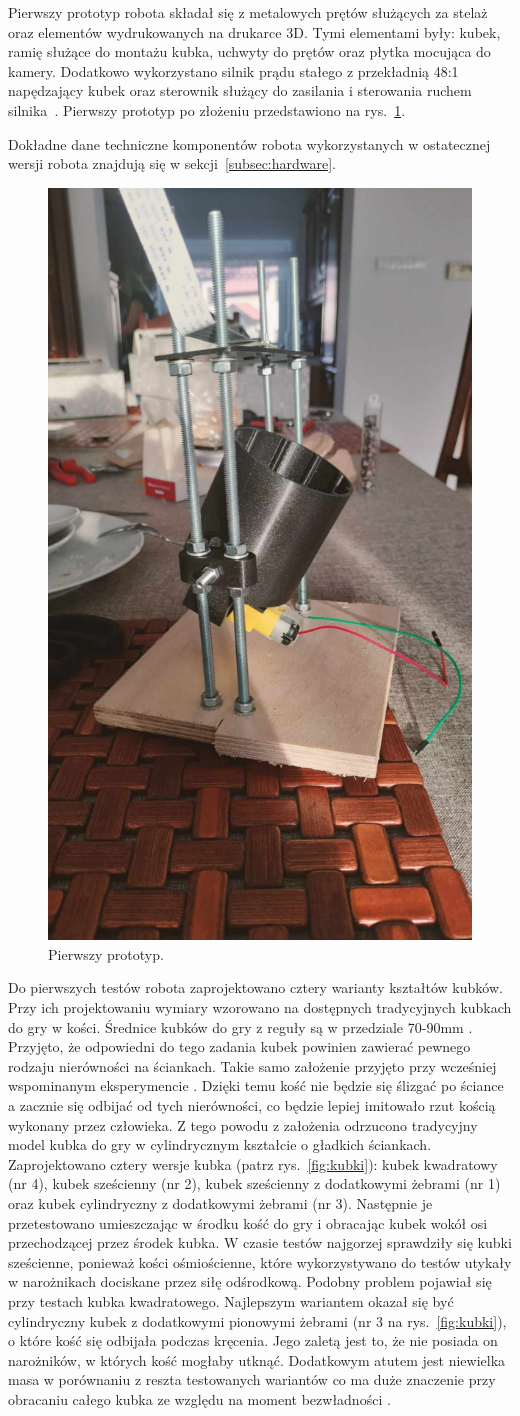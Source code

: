 Pierwszy prototyp robota składał się z metalowych prętów służących za stelaż oraz elementów wydrukowanych na drukarce 3D.
Tymi elementami były: kubek, ramię służące do montażu kubka, uchwyty do prętów oraz płytka mocująca do kamery. Dodatkowo
wykorzystano silnik prądu stałego z przekładnią 48:1 napędzający kubek oraz sterownik służący do zasilania i sterowania ruchem silnika~\cite{wheel,L298}.
Pierwszy prototyp po złożeniu przedstawiono na rys.~\ref{fig:pierwszy}.

Dokładne dane techniczne komponentów robota wykorzystanych w ostatecznej wersji robota znajdują się w sekcji~\ref{subsec:hardware}.

\begin{figure}[H]
    \centering
    \includegraphics[width=0.25\linewidth, trim={35mm 75mm 35mm 30mm}, clip]{chapters/03-praca-wlasna/figures/pierwszy}
    \caption{\label{fig:pierwszy}Pierwszy prototyp.}
\end{figure}

Do pierwszych testów robota zaprojektowano cztery warianty kształtów kubków. Przy ich projektowaniu wymiary wzorowano na dostępnych tradycyjnych kubkach do gry w kości.
Średnice kubków do gry z reguły są w przedziale 70-90mm \cite{cup}. Przyjęto, że odpowiedni do tego zadania kubek powinien
zawierać pewnego rodzaju nierówności na ściankach. Takie samo założenie przyjęto przy wcześniej wspominanym eksperymencie \cite{PK}. Dzięki temu kość nie będzie się ślizgać po ściance a zacznie się odbijać od tych nierówności, co 
będzie lepiej imitowało rzut kością wykonany przez człowieka. Z tego powodu z założenia odrzucono tradycyjny model kubka do gry w cylindrycznym kształcie 
o gładkich ściankach. Zaprojektowano cztery wersje kubka (patrz rys.~\ref{fig:kubki}): kubek kwadratowy (nr 4), kubek sześcienny (nr 2), kubek sześcienny z dodatkowymi żebrami (nr 1)
oraz kubek cylindryczny z dodatkowymi żebrami (nr 3). 
Następnie je przetestowano umieszczając w środku kość do gry i obracając kubek wokół osi przechodzącej przez środek kubka. W czasie testów najgorzej sprawdziły się kubki sześcienne,
ponieważ kości ośmiościenne, które wykorzystywano do testów utykały w narożnikach dociskane przez siłę odśrodkową. Podobny problem pojawiał się przy testach kubka kwadratowego.
Najlepszym wariantem okazał się być cylindryczny kubek z dodatkowymi pionowymi żebrami (nr 3 na rys.~\ref{fig:kubki}), o które kość się odbijała podczas kręcenia.
Jego zaletą jest to, że nie posiada on narożników, w których kość mogłaby utknąć. Dodatkowym atutem jest niewielka masa w porównaniu z reszta testowanych wariantów co ma duże znaczenie 
przy obracaniu całego kubka ze względu na moment bezwładności \cite{bezwladnosc}.

